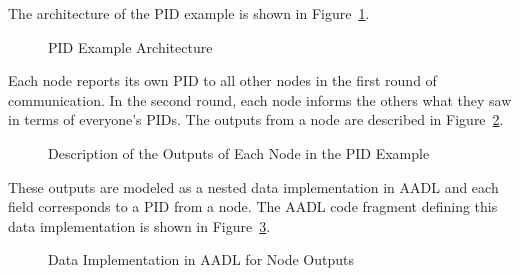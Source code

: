 The architecture of the PID example is shown in Figure~\ref{fig:PIDArch}. 
\begin{figure}[!htb]
        \caption{\label{fig:PIDArch} PID Example Architecture}
\end{figure}

Each node reports its own PID to all other nodes in the first round of communication. In the second round, each node informs the others what they saw in terms of %
everyone's PIDs. %
The outputs from a node are described in Figure~\ref{fig:NodeOutputsPID}. %
\begin{figure}[!htb]
        \caption{\label{fig:NodeOutputsPID} Description of the Outputs of Each Node in the PID Example}
\end{figure}
These outputs are modeled as a nested data implementation in AADL and each field corresponds to a PID from a node. The AADL code fragment defining this data implementation is shown in Figure~\ref{fig:PIDNodeData}.

\begin{figure}[!htb]
        \caption{\label{fig:PIDNodeData} Data Implementation in AADL for Node Outputs}
\end{figure}

